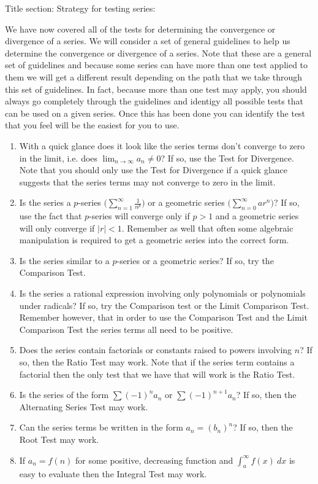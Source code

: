 \documentclass[10pt]{article}
\newcommand{\ds}{\displaystyle}
\begin{document}
Title section: Strategy for testing series:


We have now covered all of the tests for determining the convergence or divergence of a series. We will consider a set of general guidelines to help us determine the convergence or divergence of a series. Note that these are a general set of guidelines and because some series can have more than one test applied to them we will get a different result depending on the path that we take through this set of guidelines. In fact, because more than one test may apply, you should always go completely through the guidelines and identigy all possible tests that can be used on a given series. Once this has been done you can identify the test that you feel will be the easiest for you to use.

\begin{enumerate}
\item With a quick glance does it look like the series terms don't converge to zero in the limit, i.e. does $\ds \lim_{n\to \infty}a_n \not= 0$? If so, use the Test for Divergence. Note that you should only use the Test for Divergence if a quick glance suggests that the series terms may not converge to zero in the limit.

\item Is the series a $p$-series $\biggl(\ds \sum_{n=1}^\infty \frac{1}{n^p}\biggr)$ or a geometric series $\ds \biggl( \sum_{n=0}^\infty ar^n\biggr)$? If so, use the fact that $p$-series will converge only  if $p>1$ and a geometric series will only converge if $|r|<1$. Remember as well that often some algebraic manipulation is required to get a geometric series into the correct form.

\item Is the series similar to a $p$-series or a geometric series? If so, try the Comparison Test.

\item Is the series a rational expression involving only polynomials or polynomials under radicals? If so, try the Comparison test or the Limit Comparison Test. Remember however, that in order to use the Comparison Test and the Limit Comparison Test the series terms all need to be positive.

\item Does the series contain factorials or constants raised to powers involving $n$? If so, then the Ratio Test may work. Note that if the series term contains a factorial then the only test that we have that will work is the Ratio Test.

\item Is the series of the form $\ds \sum (-1)^n a_n$ or $\sum (-1)^{n+1} a_n$? If so, then the Alternating Series Test may work.

\item Can the series terms be written in the form $a_n=(b_n)^n$? If so, then the Root Test may work.

\item
If $a_n=f(n)$ for some positive, decreasing function and $\ds \int_a^\infty f(x)~dx$ is easy to evaluate then the Integral Test may work.
\end{enumerate}
\end{document}
